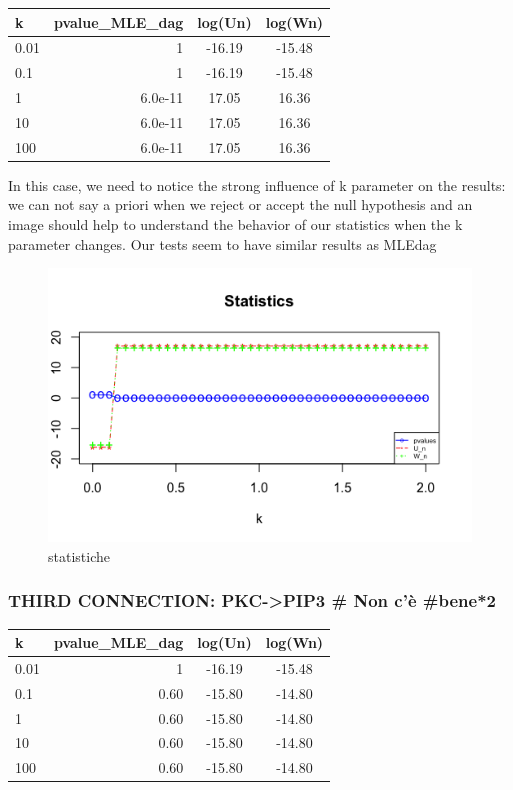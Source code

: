 \documentclass[
]{article}
\begin{document}
\begin{longtable}[]{@{}lrcc@{}}
\toprule
k & pvalue\_MLE\_dag & log(Un) & log(Wn)\tabularnewline
\midrule
\endhead
0.01 & 1 & -16.19 & -15.48\tabularnewline
0.1 & 1 & -16.19 & -15.48\tabularnewline
1 & 6.0e-11 & 17.05 & 16.36\tabularnewline
10 & 6.0e-11 & 17.05 & 16.36\tabularnewline
100 & 6.0e-11 & 17.05 & 16.36\tabularnewline
\bottomrule
\end{longtable}

In this case, we need to notice the strong influence of k parameter on
the results: we can not say a priori when we reject or accept the null
hypothesis and an image should help to understand the behavior of our
statistics when the k parameter changes. Our tests seem to have similar
results as MLEdag

\begin{figure}
\centering
\includegraphics{data/statistics_images/Part5.2.png}
\caption{statistiche}
\end{figure}

\hypertarget{third-connection-pkc-pip3-non-cuxe8-bene2}{%
\subsubsection{THIRD CONNECTION: PKC-\textgreater PIP3 \# Non c'è
\#bene*2}\label{third-connection-pkc-pip3-non-cuxe8-bene2}}

\begin{longtable}[]{@{}lrcc@{}}
\toprule
k & pvalue\_MLE\_dag & log(Un) & log(Wn)\tabularnewline
\midrule
\endhead
0.01 & 1 & -16.19 & -15.48\tabularnewline
0.1 & 0.60 & -15.80 & -14.80\tabularnewline
1 & 0.60 & -15.80 & -14.80\tabularnewline
10 & 0.60 & -15.80 & -14.80\tabularnewline
100 & 0.60 & -15.80 & -14.80\tabularnewline
\bottomrule
\end{longtable}
\end{document}
